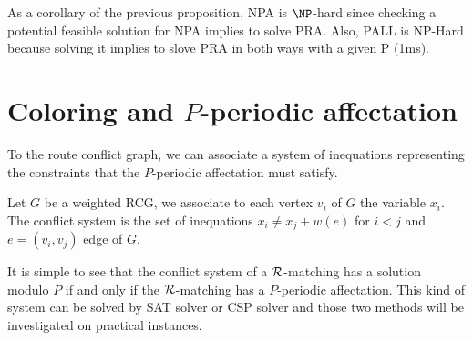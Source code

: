 \documentclass{article}
\newcommand\rmatching{$\cal R$-matching\xspace}
\begin{document}
% 
% 
% 
% 
% 

As a corollary of the previous proposition, NPA is $\NP$-hard since checking a potential feasible solution for NPA implies to solve PRA.
Also, PALL is NP-Hard because solving it implies to slove PRA in both ways with a given P (1ms).




\section{Coloring and $P$-periodic affectation}

To the route conflict graph, we can associate a system of inequations representing the constraints that the 
$P$-periodic affectation must satisfy.

\begin{definition}
 Let $G$ be a weighted RCG, we associate to each vertex $v_i$ of $G$ the variable $x_i$.
 The conflict system is the set of inequations $ x_i \neq x_j + w(e)$ for $i < j$ and $e=(v_i,v_j)$ edge of $G$.
\end{definition}

It is simple to see that the conflict system of a \rmatching has a solution modulo $P$ if and only if 
the \rmatching has a $P$-periodic affectation. This kind of system can be solved by SAT solver or CSP solver and those two methods will be investigated on practical instances.
\end{document}
